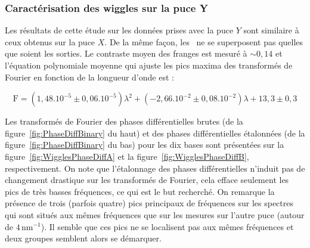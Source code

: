 \subsubsection{Caractérisation des wiggles sur la puce Y}

Les résultats de cette étude sur les données prises avec la puce $Y$ sont similaire à ceux obtenus sur la puce $X$. De la même façon, les \wiggles~ne se superposent pas quelles que soient les sorties. Le contraste moyen des franges est mesuré à $\sim 0,14$ et l'équation polynomiale moyenne qui ajuste les pics maxima des transformés de Fourier en fonction de la longueur d'onde est :

\begin{equation}
    \text{F} = (1,48.10^{-5} \pm 0,06.10^{-5}) \lambda^2 + (-2,66.10^{-2} \pm 0,08.10^{-2}) \lambda + 13,3 \pm 0,3
\end{equation}

Les transformés de Fourier des phases différentielles brutes (de la figure~\ref{fig:PhaseDiffBinary} du haut) et des phases différentielles étalonnées (de la figure~\ref{fig:PhaseDiffBinary} du bas) pour les dix bases sont présentées sur la figure~\ref{fig:WigglesPhaseDiffA} et la figure~\ref{fig:WigglesPhaseDiffB}, respectivement. On note que l'étalonnage des phases différentielles n'induit pas de changement drastique sur les transformés de Fourier, cela efface seulement les pics de très basses fréquences, ce qui est le but recherché. On remarque la présence de trois (parfois quatre) pics principaux de fréquences sur les spectres qui sont situés aux mêmes fréquences que sur les mesures sur l'autre puce (autour de $4 \, \text{nm}^{-1}$). Il semble que ces pics ne se localisent pas aux mêmes fréquences et deux groupes semblent alors se démarquer.

